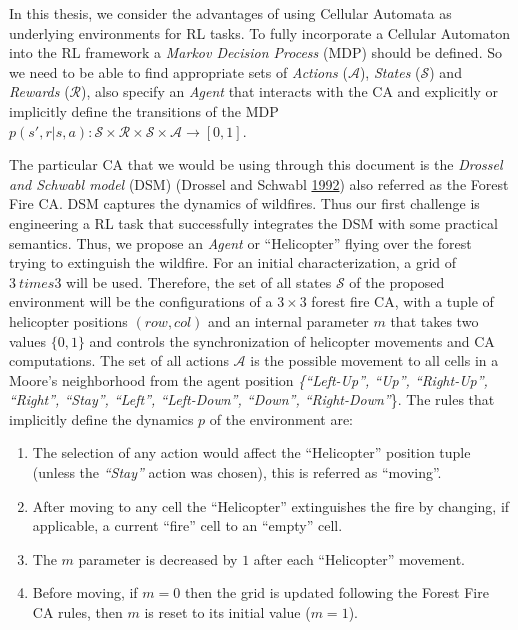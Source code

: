 \documentclass[
  12pt,
  openany]{book}
\providecommand{\tightlist}{%
  \setlength{\itemsep}{0pt}\setlength{\parskip}{0pt}}
\begin{document}
In this thesis, we consider the advantages of using Cellular Automata as underlying environments for RL tasks. To fully incorporate a Cellular Automaton into the RL framework a \emph{Markov Decision Process} (MDP) should be defined. So we need to be able to find appropriate sets of \emph{Actions} (\(\mathcal{A}\)), \emph{States} (\(\mathcal{S}\)) and \emph{Rewards} (\(\mathcal{R}\)), also specify an \emph{Agent} that interacts with the CA and explicitly or implicitly define the transitions of the MDP \(p(s',r|s,a): \mathcal{S} \times \mathcal{R} \times \mathcal{S} \times \mathcal{A} \rightarrow [0,1]\).

The particular CA that we would be using through this document is the \emph{Drossel and Schwabl model} (DSM) (Drossel and Schwabl \protect\hyperlink{ref-drossel1992self}{1992}) also referred as the Forest Fire CA. DSM captures the dynamics of wildfires. Thus our first challenge is engineering a RL task that successfully integrates the DSM with some practical semantics. Thus, we propose an \emph{Agent} or ``Helicopter'' flying over the forest trying to extinguish the wildfire. For an initial characterization, a grid of \(3 \ times 3\) will be used. Therefore, the set of all states \(\mathcal{S}\) of the proposed environment will be the configurations of a \(3 \times 3\) forest fire CA, with a tuple of helicopter positions \((row,col)\) and an internal parameter \(m\) that takes two values \(\{0, 1\}\) and controls the synchronization of helicopter movements and CA computations. The set of all actions \(\mathcal{A}\) is the possible movement to all cells in a Moore's neighborhood from the agent position \emph{\{``Left-Up'', ``Up'', ``Right-Up'', ``Right'', ``Stay'', ``Left'', ``Left-Down'', ``Down'', ``Right-Down''}\}. The rules that implicitly define the dynamics \(p\) of the environment are:

\begin{enumerate}
\def\labelenumi{\arabic{enumi}.}
\tightlist
\item
  The selection of any action would affect the ``Helicopter'' position tuple (unless the \emph{``Stay''} action was chosen), this is referred as ``moving''.
\item
  After moving to any cell the ``Helicopter'' extinguishes the fire by changing, if applicable, a current ``fire'' cell to an ``empty'' cell.
\item
  The \(m\) parameter is decreased by \(1\) after each ``Helicopter'' movement.
\item
  Before moving, if \(m=0\) then the grid is updated following the Forest Fire CA rules, then \(m\) is reset to its initial value (\(m=1\)).
\end{enumerate}
\end{document}
